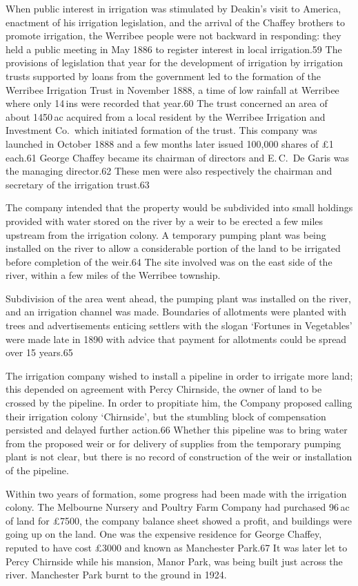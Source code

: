 When public interest in irrigation was stimulated by Deakin's visit to
America, enactment of his irrigation legislation, and the arrival of
the Chaffey brothers to promote irrigation, the Werribee people were
not backward in responding: they held a public meeting in May 1886 to
register interest in local irrigation.59 The provisions of legislation
that year for the development of irrigation by irrigation trusts
supported by loans from the government led to the formation of the
Werribee Irrigation Trust in November 1888, a time of low rainfall at
Werribee where only 14\,ins were recorded that year.60 The trust
concerned an area of about 1450\,ac acquired from a local resident by
the Werribee Irrigation and Investment Co.\ which initiated formation
of the trust.  This company was launched in October 1888 and a few
months later issued 100,000 shares of \pounds1 each.61 George Chaffey
became its chairman of directors and E.\,C.~De Garis was the managing
director.62  These men were also respectively the chairman and
secretary of the irrigation trust.63

The company intended that the property would be subdivided into small
holdings provided with water stored on the river by a weir to be
erected a few miles upstream from the irrigation colony. A temporary
pumping plant was being installed on the river to allow a considerable
portion of the land to be irrigated before completion of the weir.64
The site involved was on the east side of the river, within a few
miles of the Werribee township.

Subdivision of the area went ahead, the pumping plant was installed on
the river, and an irrigation channel was made. Boundaries of
allotments were planted with trees and advertisements enticing
settlers with the slogan `Fortunes in Vegetables' were made late in
1890 with advice that payment for allotments could be spread over 15
years.65

The irrigation company wished to install a pipeline in order to
irrigate more land; this depended on agreement with Percy Chirnside,
the owner of land to be crossed by the pipeline.  In order to
propitiate him, the Company proposed calling their irrigation colony
`Chirnside', but the stumbling block of compensation persisted and
delayed further action.66 Whether this pipeline was to bring water
from the proposed weir or for delivery of supplies from the temporary
pumping plant is not clear, but there is no record of construction of
the weir or installation of the pipeline.

Within two years of formation, some progress had been made with the
irrigation colony.  The Melbourne Nursery and Poultry Farm Company had
purchased 96\,ac of land for \pounds7500, the company balance sheet
showed a profit, and buildings were going up on the land.  One was the
expensive residence for George Chaffey, reputed to have cost
\pounds3000 and known as Manchester Park.67 It was later let to Percy
Chirnside while his mansion, Manor Park, was being built just across
the river.  Manchester Park burnt to the ground in 1924.

